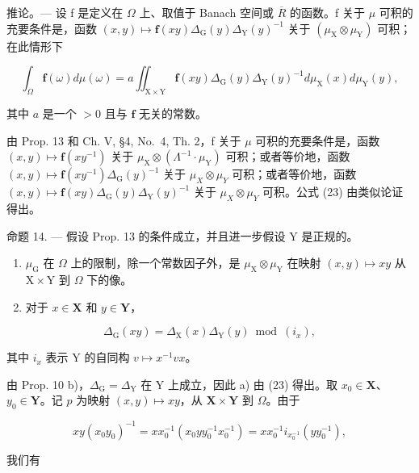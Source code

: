 推论。--- 设 f 是定义在 \(\Omega\) 上、取值于 Banach 空间或 \(\overline{R}\) 的函数。f 关于 \(\mu\) 可积的充要条件是，函数 \((x,y)\mapsto\mathbf{f}(xy)\Delta_{\mathrm{G}}(y)\Delta_{\mathrm{Y}}(y)^{-1}\) 关于 \((\mu_{\mathrm{X}}\otimes\mu_{\mathrm{Y}})\) 可积；在此情形下

\[
\int_ {\Omega} \mathbf {f} (\omega) d \mu (\omega) = a \iint_ {\mathrm{X} \times \mathrm{Y}} \mathbf {f} (x y) \Delta_ {\mathrm{G}} (y) \Delta_ {\mathrm{Y}} (y) ^ {- 1} d \mu_ {\mathrm{X}} (x) d \mu_ {\mathrm{Y}} (y),\tag{23}
\]

其中 \(a\) 是一个 \(>0\) 且与 \(\mathbf{f}\) 无关的常数。

由 Prop. 13 和 Ch. V, §4, No.~4, Th. 2，f 关于 \(\mu\) 可积的充要条件是，函数 \((x,y)\mapsto\mathbf{f}(xy^{-1})\) 关于 \(\mu_{\mathrm{X}}\otimes(\Lambda^{-1}\cdot\mu_{\mathrm{Y}})\) 可积；或者等价地，函数 \((x,y)\mapsto\mathbf{f}(xy^{-1})\Delta_{\mathrm{G}}(y)^{-1}\) 关于 \(\mu_{X}\otimes\mu_{Y}\) 可积；或者等价地，函数 \((x,y)\mapsto\mathbf{f}(xy)\Delta_{\mathrm{G}}(y)\Delta_{\mathrm{Y}}(y)^{-1}\) 关于 \(\mu_{X}\otimes\mu_{Y}\) 可积。公式 (23) 由类似论证得出。

命题 14. --- 假设 Prop. 13 的条件成立，并且进一步假设 Y 是正规的。

\begin{enumerate}
\def\labelenumi{\alph{enumi})}
\item
  \(\mu_{\mathrm{G}}\) 在 \(\Omega\) 上的限制，除一个常数因子外，是 \(\mu_{\mathrm{X}} \otimes \mu_{\mathrm{Y}}\) 在映射 \((x,y) \mapsto xy\) 从 \(\mathrm{X} \times \mathrm{Y}\) 到 \(\Omega\) 下的像。
\item
  对于 \(x \in \mathbf{X}\) 和 \(y \in \mathbf{Y}\)，
\end{enumerate}

\[
\Delta_ {\mathrm{G}} (x y) = \Delta_ {\mathrm{X}} (x) \Delta_ {\mathrm{Y}} (y) \bmod (i _ {x}),
\]

其中 \(i_x\) 表示 Y 的自同构 \(v \mapsto x^{-1}vx\)。

由 Prop. 10 b)，\(\Delta_{\mathrm{G}} = \Delta_{\mathrm{Y}}\) 在 Y 上成立，因此 a) 由 (23) 得出。取 \(x_0 \in \mathbf{X}\)、\(y_0 \in \mathbf{Y}\)。记 \(p\) 为映射 \((x, y) \mapsto xy\)，从 \(\mathbf{X} \times \mathbf{Y}\) 到 \(\Omega\)。由于

\[
x y \left(x _ {0} y _ {0}\right) ^ {- 1} = x x _ {0} ^ {- 1} \left(x _ {0} y y _ {0} ^ {- 1} x _ {0} ^ {- 1}\right) = x x _ {0} ^ {- 1} i _ {x _ {0} ^ {- 1}} \left(y y _ {0} ^ {- 1}\right),
\]

我们有


